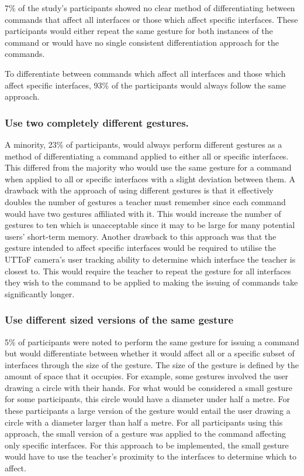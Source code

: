 \documentclass[manuscript, review, screen]{acmart}
\begin{document}
7\% of the study's participants showed no clear method of differentiating between commands that affect all interfaces or those which affect specific interfaces. 
These participants would either repeat the same gesture for both instances of the command or would have no single consistent differentiation approach for the commands. 

To differentiate between commands which affect all interfaces and those which affect specific interfaces, 93\% of the participants would always follow the same approach.

\subsubsection{Use two completely different gestures.}

A minority, 23\% of participants, would always perform different gestures as a method of differentiating a command applied to either all or specific interfaces.
This differed from the majority who would use the same gesture for a command when applied to all or specific interfaces with a slight deviation between them.
A drawback with the approach of using different gestures is that it effectively doubles the number of gestures a teacher must remember since each command would have two gestures affiliated with it.
This would increase the number of gestures to ten which is unacceptable since it may to be large for many potential users' short-term memory.
Another drawback to this approach was that the gesture intended to affect specific interfaces would be required to utilise the \ac{UTToF} camera's user tracking ability to determine which interface the teacher is closest to.
This would require the teacher to repeat the gesture for all interfaces they wish to the command to be applied to making the issuing of commands take significantly longer.

\subsubsection{Use different sized versions of the same gesture}

5\% of participants were noted to perform the same gesture for issuing a command but would differentiate between whether it would affect all or a specific subset of interfaces through the size of the gesture.
The size of the gesture is defined by the amount of space that it occupies.
For example, some gestures involved the user drawing a circle with their hands.
For what would be considered a small gesture for some participants, this circle would have a diameter under half a metre.
For these participants a large version of the gesture would entail the user drawing a circle with a diameter larger than half a metre.
For all participants using this approach, the small version of a gesture was applied to the command affecting only specific interfaces.
For this approach to be implemented, the small gesture would have to use the teacher's proximity to the interfaces to determine which to affect.
\end{document}
